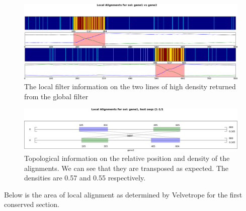 \documentclass[phd,tocprelim]{cornell}
\begin{document}
\begin{figure}[hpt]
	\centering
		\includegraphics[width=1.0\textwidth]{figures/velvetrope/path1_1.png}
        \caption[Local Velvetrope filter for NW trasposition test]{The local filter information on the two lines of high density returned from the global filter}
	\label{fig:07}
\end{figure}

\begin{figure}[hpt]
	\centering
		\includegraphics[width=1.0\textwidth]{figures/velvetrope/path1_2.png}
	\caption[Topological information of NW transposition test]{Topological information on the relative position and density of the alignments. We can see that they are transposed as expected. The densities are 0.57 and 0.55 respectively.}
	\label{fig:08}
\end{figure}

Below is the area of local alignment as determined by Velvetrope for the first conserved section.
\end{document}
